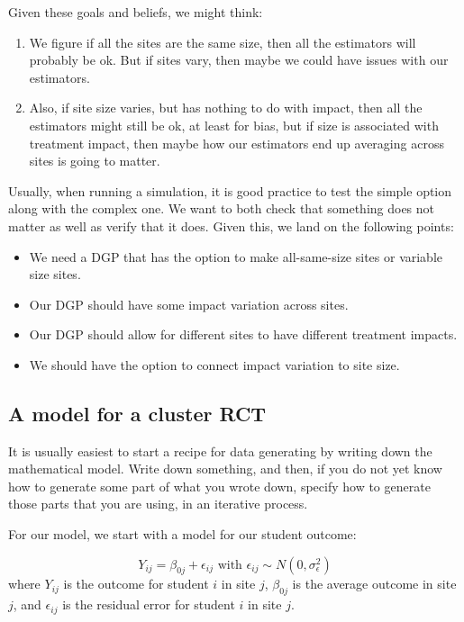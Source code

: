 \documentclass[
]{book}
\providecommand{\tightlist}{%
  \setlength{\itemsep}{0pt}\setlength{\parskip}{0pt}}
\begin{document}
Given these goals and beliefs, we might think:

\begin{enumerate}
\def\labelenumi{\arabic{enumi})}
\tightlist
\item
  We figure if all the sites are the same size, then all the estimators will probably be ok. But if sites vary, then maybe we could have issues with our estimators.
\item
  Also, if site size varies, but has nothing to do with impact, then all the estimators might still be ok, at least for bias, but if size is associated with treatment impact, then maybe how our estimators end up averaging across sites is going to matter.
\end{enumerate}

Usually, when running a simulation, it is good practice to test the simple option along with the complex one.
We want to both check that something does not matter as well as verify that it does.
Given this, we land on the following points:

\begin{itemize}
\tightlist
\item
  We need a DGP that has the option to make all-same-size sites or variable size sites.
\item
  Our DGP should have some impact variation across sites.
\item
  Our DGP should allow for different sites to have different treatment impacts.
\item
  We should have the option to connect impact variation to site size.
\end{itemize}

\subsection{A model for a cluster RCT}\label{a-model-for-a-cluster-rct}

It is usually easiest to start a recipe for data generating by writing down the mathematical model.
Write down something, and then, if you do not yet know how to generate some part of what you wrote down, specify how to generate those parts that you are using, in an iterative process.

For our model, we start with a model for our student outcome:

\[ Y_{ij} = \beta_{0j} + \epsilon_{ij} \mbox{ with } \epsilon_{ij} \sim N( 0, \sigma^2_\epsilon ) \]
where \(Y_{ij}\) is the outcome for student \(i\) in site \(j\), \(\beta_{0j}\) is the average outcome in site \(j\), and \(\epsilon_{ij}\) is the residual error for student \(i\) in site \(j\).
\end{document}
